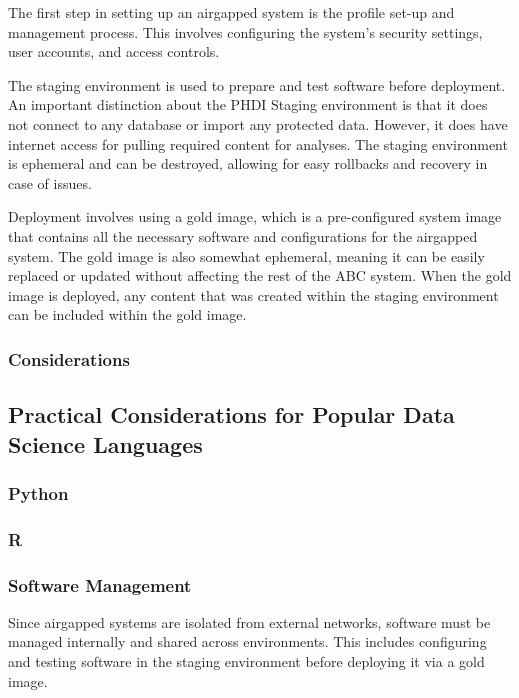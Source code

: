 \documentclass{amia}
\begin{document}
The first step in setting up an airgapped system is the profile set-up and management process. This involves configuring the system's security settings, user accounts, and access controls.  

The staging environment is used to prepare and test software before deployment. An important distinction about the PHDI Staging environment is that it does not connect to any database or import any protected data. However, it does have internet access for pulling required content for analyses. The staging environment is ephemeral and can be destroyed, allowing for easy rollbacks and recovery in case of issues. 

Deployment involves using a gold image, which is a pre-configured system image that contains all the necessary software and configurations for the airgapped system. The gold image is also somewhat ephemeral, meaning it can be easily replaced or updated without affecting the rest of the ABC system. When the gold image is deployed, any content that was created within the staging environment can be included within the gold image. 

\subsubsection{Considerations}

\subsection*{Practical Considerations for Popular Data Science Languages}

\subsubsection*{Python}

\subsubsection*{R}

\subsubsection*{Software Management}

Since airgapped systems are isolated from external networks, software must be managed internally and shared across environments. This includes configuring and testing software in the staging environment before deploying it via a gold image. 
\end{document}
